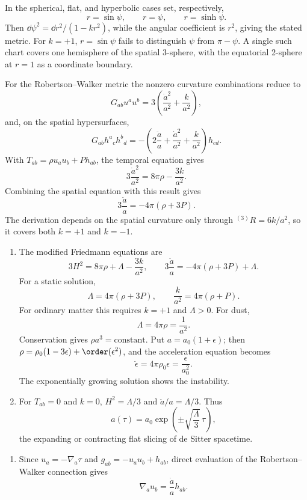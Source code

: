 \ExerciseEditorialNote

\begin{enumerate}[leftmargin=2.8em,itemsep=1.2em]
In the spherical, flat, and hyperbolic cases set, respectively,
\[
 r=\sin\psi,\qquad r=\psi,\qquad r=\sinh\psi.
\]
Then \(\dd\psi^2=\dd r^2/(1-kr^2)\), while the angular coefficient is
\(r^2\), giving the stated metric.  For \(k=+1\), \(r=\sin\psi\) fails to
distinguish \(\psi\) from \(\pi-\psi\).  A single such chart covers one
hemisphere of the spatial 3-sphere, with the equatorial 2-sphere at \(r=1\)
as a coordinate boundary.

For the Robertson--Walker metric the nonzero curvature combinations reduce to
\[
 G_{ab}u^au^b=3\left(\frac{\dot a^2}{a^2}+\frac{k}{a^2}\right),
\]
and, on the spatial hypersurfaces,
\[
 G_{ab}h^a{}_ch^b{}_d
 =-\left(2\frac{\ddot a}{a}+\frac{\dot a^2}{a^2}
 +\frac{k}{a^2}\right)h_{cd}.
\]
With \(T_{ab}=\rho u_au_b+Ph_{ab}\), the temporal equation gives
\[
 3\frac{\dot a^2}{a^2}=8\pi\rho-\frac{3k}{a^2}.
\]
Combining the spatial equation with this result gives
\[
 3\frac{\ddot a}{a}=-4\pi(\rho+3P).
\]
The derivation depends on the spatial curvature only through
\({}^{(3)}R=6k/a^2\), so it covers both \(k=+1\) and \(k=-1\).

\begin{enumerate}[label=\alph*),leftmargin=2em]
\item The modified Friedmann equations are
\[
 3H^2=8\pi\rho+\Lambda-\frac{3k}{a^2},
 \qquad
 3\frac{\ddot a}{a}=-4\pi(\rho+3P)+\Lambda.
\]
For a static solution,
\[
 \Lambda=4\pi(\rho+3P),
 \qquad
 \frac{k}{a^2}=4\pi(\rho+P).
\]
For ordinary matter this requires \(k=+1\) and \(\Lambda>0\).  For dust,
\[
 \Lambda=4\pi\rho=\frac1{a^2}.
\]
Conservation gives \(\rho a^3=\text{constant}\).  Put
\(a=a_0(1+\epsilon)\); then
\(\rho=\rho_0(1-3\epsilon)+\order(\epsilon^2)\), and the acceleration
equation becomes
\[
 \ddot\epsilon=4\pi\rho_0\epsilon=\frac{\epsilon}{a_0^2}.
\]
The exponentially growing solution shows the instability.

\item For \(T_{ab}=0\) and \(k=0\),
\(H^2=\Lambda/3\) and \(\ddot a/a=\Lambda/3\).  Thus
\[
 a(\tau)=a_0\exp\!\left(\pm\sqrt{\frac{\Lambda}{3}}\,\tau\right),
\]
the expanding or contracting flat slicing of de Sitter spacetime.
\end{enumerate}

\begin{enumerate}[label=\alph*),leftmargin=2em]
\item Since \(u_a=-\nabla_a\tau\) and
\(g_{ab}=-u_au_b+h_{ab}\), direct evaluation of the Robertson--Walker
connection gives
\[
 \nabla_au_b=\frac{\dot a}{a}h_{ab}.
\]


\end{enumerate}
\end{enumerate}
